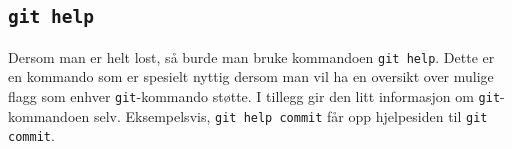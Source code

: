 \begin{alphasection}
\subsection{\texttt{git help}}

Dersom man er helt lost, så burde man bruke kommandoen \verb|git help|. Dette er en kommando som er spesielt nyttig dersom man vil ha en oversikt over mulige flagg som enhver \verb|git|-kommando støtte. I tillegg gir den litt informasjon om \verb|git|-kommandoen selv. Eksempelsvis, \verb|git help commit| får opp hjelpesiden til \verb|git commit|.

\end{alphasection}
\setcounter{section}{0}